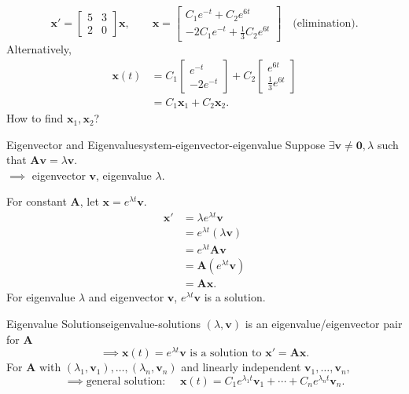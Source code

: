 \begin{example}
  \[
    \mathbf{x}'=
    \begin{bmatrix}
      5 & 3 \\2&0
    \end{bmatrix}
    \mathbf{x},\qquad
    \mathbf{x}=
    \begin{bmatrix}
      C_1e^{-t}+C_2e^{6t} \\
      -2C_1e^{-t}+\frac13C_2e^{6t}
    \end{bmatrix}
    \quad\text{(elimination).}
  \]
  Alternatively,
  \begin{align*}
    \mathbf{x}(t) & =C_1
    \begin{bmatrix}
      e^{-t} \\-2e^{-t}
    \end{bmatrix}
    +C_2
    \begin{bmatrix}
      e^{6t} \\\frac13e^{6t}
    \end{bmatrix}
    \\
                  & =C_1\mathbf{x}_1+C_2\mathbf{x}_2.
  \end{align*}
  How to find $\mathbf{x}_1,\mathbf{x}_2$?
\end{example}

\begin{definition}{Eigenvector and Eigenvalue}{system-eigenvector-eigenvalue}
  Suppose $\exists\mathbf{v}\ne\mathbf{0},\lambda$ such that
  $\mathbf{A}\mathbf{v}=\lambda\mathbf{v}$.\\
  $\implies$ eigenvector $\mathbf{v}$, eigenvalue $\lambda$.
\end{definition}

For constant $\mathbf{A}$, let $\mathbf{x}=e^{\lambda t}\mathbf{v}$.
\begin{align*}
  \mathbf{x}' & =\lambda e^{\lambda t}\mathbf{v}     \\
              & =e^{\lambda t}(\lambda\mathbf{v})    \\
              & =e^{\lambda t}\mathbf{A}\mathbf{v}   \\
              & =\mathbf{A}(e^{\lambda t}\mathbf{v}) \\
              & =\mathbf{A}\mathbf{x}.
\end{align*}
For eigenvalue $\lambda$ and eigenvector $\mathbf{v}$,
$e^{\lambda t}\mathbf{v}$ is a solution.

\begin{theorem}{Eigenvalue Solutions}{eigenvalue-solutions}
  $(\lambda,\mathbf{v})$ is an eigenvalue/eigenvector pair for $\mathbf{A}$
  \[
    \implies \mathbf{x}(t)=e^{\lambda t}\mathbf{v}
    \text{ is a solution to }\mathbf{x}'=\mathbf{A}\mathbf{x}.
  \]
  For $\mathbf{A}$ with $(\lambda_1,\mathbf{v}_1),\ldots,(\lambda_n,\mathbf{v}_n)$
  and linearly independent $\mathbf{v}_1,\ldots,\mathbf{v}_n$,
  \[
    \implies\text{general solution: }\quad
    \mathbf{x}(t)=C_1e^{\lambda_1t}\mathbf{v}_1+\cdots+C_ne^{\lambda_nt}\mathbf{v}_n.
  \]
\end{theorem}

